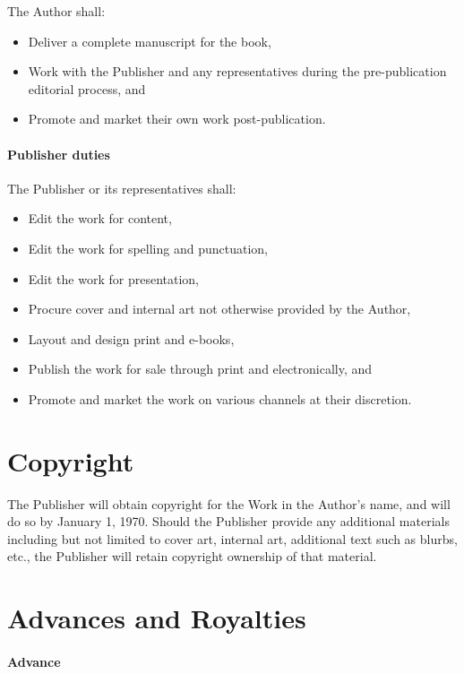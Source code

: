 \documentclass[12pt,letterpaper]{article}
\def\CopyrightDate{January 1, 1970}
\begin{document}
The Author shall:

\begin{itemize}
    \item Deliver a complete manuscript for the book,
    \item Work with the Publisher and any representatives during the pre-publication editorial process, and
    \item Promote and market their own work post-publication.
\end{itemize}

\paragraph{Publisher duties}

The Publisher or its representatives shall:

\begin{itemize}
    \item Edit the work for content,
    \item Edit the work for spelling and punctuation,
    \item Edit the work for presentation,
    \item Procure cover and internal art not otherwise provided by the Author,
    \item Layout and design print and e-books,
    \item Publish the work for sale through print and electronically, and
    \item Promote and market the work on various channels at their discretion.
\end{itemize}

\section{Copyright}

The Publisher will obtain copyright for the Work in the Author's name, and will do so by \CopyrightDate. Should the Publisher provide any additional materials including but not limited to cover art, internal art, additional text such as blurbs, etc., the Publisher will retain copyright ownership of that material.

\section{Advances and Royalties}

\paragraph{Advance}
\end{document}
